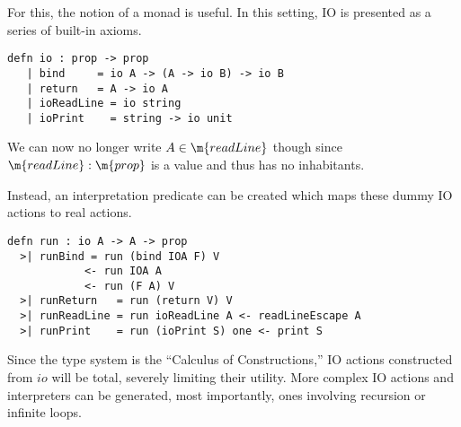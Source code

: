 For this, the notion of a monad is useful.  
In this setting, IO is presented as a series of built-in axioms.

\begin{lstlisting}
defn io : prop -> prop
   | bind     = io A -> (A -> io B) -> io B
   | return   = A -> io A
   | ioReadLine = io string
   | ioPrint    = string -> io unit
\end{lstlisting}

We can now no longer write $A \in \m{readLine}$ though since $\m{readLine} : \m{prop}$ 
is a value and thus has no inhabitants. 

Instead, an interpretation predicate can be created which maps these dummy IO actions to real actions.

\begin{lstlisting}
defn run : io A -> A -> prop
  >| runBind = run (bind IOA F) V
            <- run IOA A 
            <- run (F A) V 
  >| runReturn   = run (return V) V
  >| runReadLine = run ioReadLine A <- readLineEscape A
  >| runPrint    = run (ioPrint S) one <- print S
\end{lstlisting}

Since the type system is the ``Calculus of Constructions,'' IO actions constructed
from $io$ will be total, severely limiting their utility.
More complex IO actions and interpreters can be generated, most importantly, ones involving recursion 
or infinite loops.

